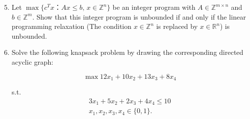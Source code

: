 \documentclass[11pt,a4paper]{article}
\begin{document}
\begin{enumerate}
  \setcounter{enumi}{4}
\item Let $\max\{c^Tx ： Ax ≤ b, \, x ∈ ℤ^n\}$ be an integer program with $A ∈ℤ^{m × n }$ and $b ∈ℤ^m$. Show that this integer program is unbounded if and only if the linear programming relaxation (The condition $x ∈ ℤ^n$ is replaced by $x ∈ℝ^n$) is unbounded.


\item 
  Solve the following knapsack problem by drawing the corresponding directed acyclic graph:

  \begin{displaymath}
    \max 12x_1 + 10 x_2 + 13 x_3 + 8 x_4 
  \end{displaymath}

  s.t.
  \begin{eqnarray*}
    3x_1 + 5 x_2 + 2 x_3 + 4 x_4 ≤ 10\\
    x_1,x_2,x_3,x_4 ∈ \{0,1\}. 
  \end{eqnarray*}
  
\end{enumerate}

%
%


 
\end{document}
